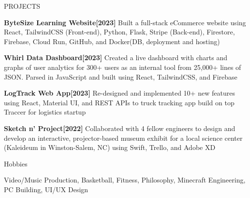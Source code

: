 \documentclass{resume} %
\begin{document}
\begin{rSection}{PROJECTS}

\vspace{-1.25em}
\item \textbf{ByteSize Learning Website[2023]} {Built a full-stack eCommerce website using React, TailwindCSS (Front-end), Python, Flask, Stripe (Back-end), Firestore, Firebase, Cloud Run, GitHub, and Docker(DB, deployment and hosting)}
\item \textbf{Whirl Data Dashboard[2023]} {Created a live dashboard with charts and graphs of user analytics for 300+ users as an internal tool from 25,000+ lines of JSON. Parsed in JavaScript and built using React, TailwindCSS, and Firebase}
\item \textbf {LogTrack Web App[2023]} {Re-designed and implemented 10+ new features using React, Material UI, and REST APIs to truck tracking app build on top Traccer for logistics startup}
\item \textbf{Sketch n' Project[2022]} {Collaborated with 4 fellow engineers to design and develop an interactive, projector-based museum exhibit for a local science center (Kaleideum in Winston-Salem, NC) using Swift, Trello, and Adobe XD}

\end{rSection} 

\begin{rSection}{Hobbies} 

Video/Music Production, Basketball, Fitness, Philosophy, Minecraft Engineering, PC Building, UI/UX Design

\end{rSection}
\end{document}

